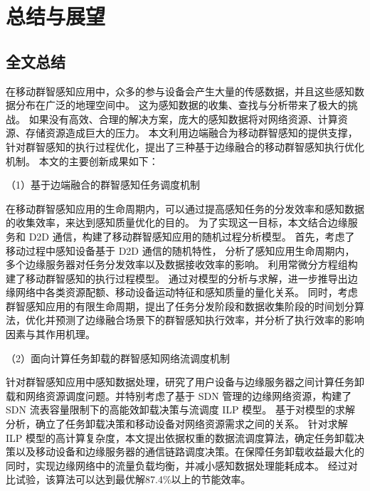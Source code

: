 \chapter{总结与展望}

\section{全文总结}


在移动群智感知应用中，众多的参与设备会产生大量的传感数据，并且这些感知数据分布在广泛的地理空间中。
这为感知数据的收集、查找与分析带来了极大的挑战。
如果没有高效、合理的解决方案，庞大的感知数据将对网络资源、计算资源、存储资源造成巨大的压力。
本文利用边端融合为移动群智感知的提供支撑，针对群智感知的执行过程优化，提出了三种基于边缘融合的移动群智感知执行优化机制。
本文的主要创新成果如下：

（1）基于边端融合的群智感知任务调度机制

在移动群智感知应用的生命周期内，可以通过提高感知任务的分发效率和感知数据的收集效率，来达到感知质量优化的目的。
为了实现这一目标，本文结合边缘服务和 D2D 通信，构建了移动群智感知应用的随机过程分析模型。
首先，考虑了移动过程中感知设备基于 D2D 通信的随机特性，
分析了感知应用生命周期内，多个边缘服务器对任务分发效率以及数据接收效率的影响。
利用常微分方程组构建了移动群智感知的执行过程模型。
通过对模型的分析与求解，进一步推导出边缘网络中各类资源配额、移动设备运动特征和感知质量的量化关系。
同时，考虑群智感知应用的有限生命周期，提出了任务分发阶段和数据收集阶段的时间划分算法，优化并预测了边缘融合场景下的群智感知执行效率，并分析了执行效率的影响因素与其作用机理。

（2）面向计算任务卸载的群智感知网络流调度机制

针对群智感知应用中感知数据处理，研究了用户设备与边缘服务器之间计算任务卸载和网络资源调度问题。并特别考虑了基于 SDN 管理的边缘网络资源，构建了 SDN 流表容量限制下的高能效卸载决策与流调度 ILP 模型。
基于对模型的求解分析，确立了任务卸载决策和移动设备对网络资源需求之间的关系。
针对求解 ILP 模型的高计算复杂度，本文提出依据权重的数据流调度算法，确定任务卸载决策以及移动设备和边缘服务器的通信链路调度决策。在保障任务卸载收益最大化的同时，实现边缘网络中的流量负载均衡，并减小感知数据处理能耗成本。
经过对比试验，该算法可以达到最优解87.4\%以上的节能效率。

